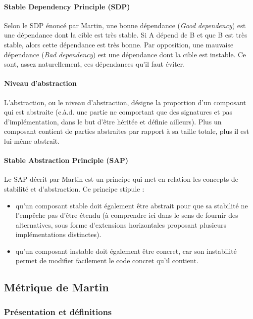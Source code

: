 \documentclass{scrartcl}
\begin{document}
    \paragraph{Stable Dependency Principle (SDP)}Selon le SDP énoncé par Martin\cite{Martin:2003}, une bonne dépendance (\emph{Good dependency}) est une dépendance dont la cible est très stable. Si A dépend de B et que B est très stable, alors cette dépendance est très bonne. Par opposition, une mauvaise dépendance (\emph{Bad dependency}) est une dépendance dont la cible est instable. Ce sont, assez naturellement, ces dépendances qu'il faut éviter.
   
    \paragraph{Niveau d'abstraction}L'abstraction, ou le niveau d'abstraction, désigne la proportion d'un composant qui est abstraite (c.à.d. une partie ne comportant que des signatures et pas d'implémentation, dans le but d'être héritée et définie ailleurs). Plus un composant contient de parties abstraites par rapport à sa taille totale, plus il est lui-même abstrait.
    

    \paragraph{Stable Abstraction Principle (SAP)}Le SAP décrit par Martin\cite{Martin:2003} est un principe qui met en relation les concepts de stabilité et d'abstraction. Ce principe stipule :
    \begin{itemize}
        \item qu'un composant stable doit également être abstrait pour que sa stabilité ne l'empêche pas d'être étendu (à comprendre ici dans le sens de fournir des alternatives, sous forme d'extensions horizontales proposant plusieurs implémentations distinctes). 
        \item qu'un composant instable doit également être concret, car son instabilité permet de modifier facilement le code concret qu'il contient.
    \end{itemize}

    
\subsection{Métrique de Martin}
\subsubsection{Présentation et définitions}
\end{document}
